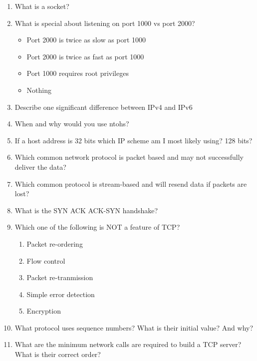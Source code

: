 \begin{enumerate}

\item What is a socket?

\item What is special about listening on port 1000 vs port 2000?

\begin{itemize}
\tightlist
\item
  Port 2000 is twice as slow as port 1000
\item
  Port 2000 is twice as fast as port 1000
\item
  Port 1000 requires root privileges
\item
  Nothing
\end{itemize}

\item Describe one significant difference between IPv4 and IPv6

\item When and why would you use ntohs?

\item If a host address is 32 bits which IP scheme am I most likely using? 128 bits?

\item Which common network protocol is packet based and may not successfully deliver the data?

\item Which common protocol is stream-based and will resend data if packets are lost?

\item What is the SYN ACK ACK-SYN handshake?

\item Which one of the following is NOT a feature of TCP?
  \begin{enumerate}
  \item Packet re-ordering
  \item Flow control
  \item Packet re-tranmission
  \item Simple error detection
  \item Encryption
  \end{enumerate}

\item What protocol uses sequence numbers? What is their initial value? And why?

\item What are the minimum network calls are required to build a TCP server? What is their correct order?


\end{enumerate}
